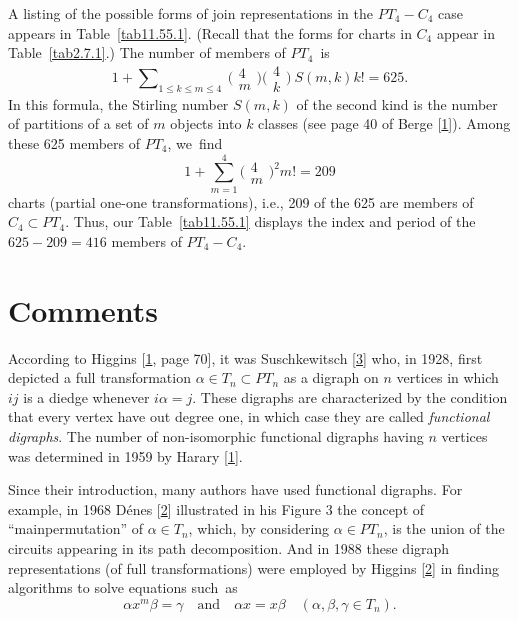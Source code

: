 \documentclass{surv-l}
\numberwithin{equation}{section}
\numberwithin{table}{section}
\numberwithin{figure}{section}
\theoremstyle{definition}
\begin{document}
A listing of the possible forms of join representations in the
$PT_{4}-C_{4}$ case appears in Table~\ref{tab11.55.1}. (Recall
that the forms for charts in $C_{4}$ appear in
Table~\ref{tab2.7.1}.) The number of members of $PT_{4}$~is
\[
1+\sum\nolimits_{1\leq k\leq m\leq 4}\ \big(\!\begin{smallmatrix}
4\\
m
\end{smallmatrix}\!\big)\big(\!\begin{smallmatrix}
4\\
k
\end{smallmatrix}\!\big)\ S(m, k)k!=625.
\]
In this formula, the Stirling number $S(m, k)$ of the second kind
is the number of partitions of a set of $m$ objects into $k$
classes (see page 40 of Berge [\hyperlink{bib3}{1}]).
Among these 625 members of $PT_{4}$, we~find
\[
1+\textstyle\sum_{m=1}^{4} \big(\!\begin{smallmatrix}
4\\
m
\end{smallmatrix}\!\big)^2 m!=209
\]
charts (partial one-one transformations), i.e., 209 of the 625 are
members of $C_{4}\subset PT_{4}$. Thus, our Table~\ref{tab11.55.1}
displays the index and period of the $625-209=416$ members of
$PT_{4}-C_{4}$.

\section{Comments}\label{sec11.56}

According to Higgins [\hyperlink{bib28}{1}, page 70], it was
Suschkewitsch
[\hyperlink{bib73b}{3}] who, in 1928, first depicted a
full transformation $\alpha\in T_{n}\subset PT_{n}$ as a digraph
on $n$ vertices in which $ij$ is a diedge whenever $i\alpha=j$.
These digraphs are characterized by the condition that every
vertex have out degree one, in which case they are called
\emph{functional digraphs}. The number of non-isomorphic
functional digraphs having $n$ vertices was determined in 1959 by
Harary [\hyperlink{bib27}{1}].

Since their introduction, many authors have used functional
digraphs. For example, in 1968 D\'{e}nes
[\hyperlink{bib11a}{2}] illustrated in his Figure 3 the
concept of ``mainpermutation'' of $\alpha\in T_{n}$, which, by
considering $\alpha\in PT_{n}$, is the union of the circuits
appearing in its path decomposition. And in 1988 these digraph
representations (of full transformations) were employed by Higgins
[\hyperlink{bib28a}{2}] in finding algorithms to solve
equations such~as
\[
\alpha x^{m}\beta=\gamma\quad \mathrm{and}\quad \alpha x=x\beta\quad
(\alpha,\beta, \gamma\in T_{n}).
\]
\end{document}
